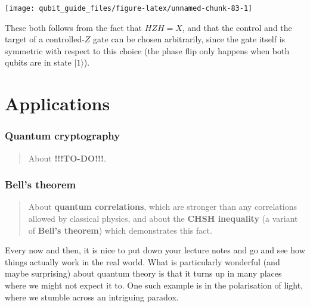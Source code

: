 \documentclass[fleqn]{article}
\let\oldsection\section
\renewcommand\section{\clearpage\oldsection}
\let\oldpart\part
\renewcommand\part{\clearpage\oldpart}
\begin{document}
\begin{center}\texttt{[image: qubit\_guide\_files/figure-latex/unnamed-chunk-83-1]} \end{center}

These both follows from the fact that \(HZH=X\), and that the control and the target of a controlled-\(Z\) gate can be chosen arbitrarily, since the gate itself is symmetric with respect to this choice (the phase flip only happens when both qubits are in state \(|1\rangle\)).

\hypertarget{part-applications}{%
\part{Applications}\label{part-applications}}

\hypertarget{quantum-cryptography}{%
\section{Quantum cryptography}\label{quantum-cryptography}}

\begin{quote}
About \textbf{!!!TO-DO!!!}.
\end{quote}

\hypertarget{bells-theorem}{%
\section{Bell's theorem}\label{bells-theorem}}

\begin{quote}
About \textbf{quantum correlations}, which are stronger than any correlations allowed by classical physics, and about the \textbf{CHSH inequality} (a variant of \textbf{Bell's theorem}) which demonstrates this fact.
\end{quote}

Every now and then, it is nice to put down your lecture notes and go and see how things actually work in the real world.
What is particularly wonderful (and maybe surprising) about quantum theory is that it turns up in many places where we might not expect it to.
One such example is in the polarisation of light, where we stumble across an intriguing paradox.
\end{document}
